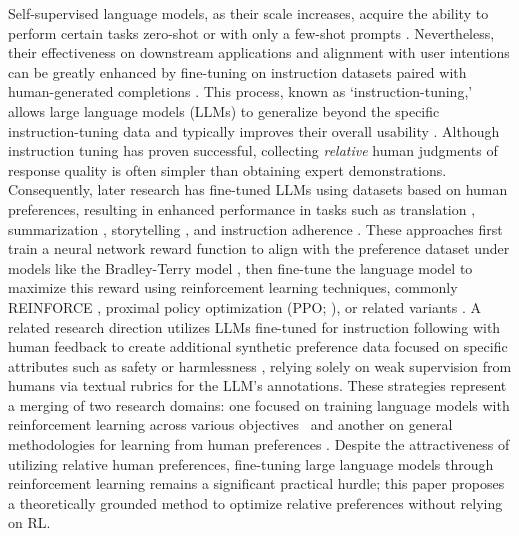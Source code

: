 Self-supervised language models, as their scale increases, acquire the ability to perform certain tasks zero-shot \citep{radford2019language} or with only a few-shot prompts \citep{gpt3,megatron,chowdhery2022palm}. Nevertheless, their effectiveness on downstream applications and alignment with user intentions can be greatly enhanced by fine-tuning on instruction datasets paired with human-generated completions \citep{mishra-etal-2022-cross,sanh2022multitask,chung2022scaling,thoppilan2022lamda}. This process, known as `instruction-tuning,' allows large language models (LLMs) to generalize beyond the specific instruction-tuning data and typically improves their overall usability \citep{chung2022scaling}. Although instruction tuning has proven successful, collecting \textit{relative} human judgments of response quality is often simpler than obtaining expert demonstrations. Consequently, later research has fine-tuned LLMs using datasets based on human preferences, resulting in enhanced performance in tasks such as translation \citep{kreutzer-etal-2018-reliability}, summarization \citep{stiennon2022learning,ziegler2020finetuning}, storytelling \citep{ziegler2020finetuning}, and instruction adherence \citep{ouyang2022training,ramamurthy2023is}. These approaches first train a neural network reward function to align with the preference dataset under models like the Bradley-Terry model \citep{bradley1952rankanalysis}, then fine-tune the language model to maximize this reward using reinforcement learning techniques, commonly REINFORCE \citep{williams1992reinforce}, proximal policy optimization (PPO; \cite{schulman2017proximal}), or related variants \citep{ramamurthy2023is}. A related research direction utilizes LLMs fine-tuned for instruction following with human feedback to create additional synthetic preference data focused on specific attributes such as safety or harmlessness \citep{bai2022constitutional}, relying solely on weak supervision from humans via textual rubrics for the LLM’s annotations. These strategies represent a merging of two research domains: one focused on training language models with reinforcement learning across various objectives~\citep{Ranzato2015SequenceLT,paulus2018a,wu2018learning} and another on general methodologies for learning from human preferences \citep{christiano2017deep,kupcsik2018learning}. Despite the attractiveness of utilizing relative human preferences, fine-tuning large language models through reinforcement learning remains a significant practical hurdle; this paper proposes a theoretically grounded method to optimize relative preferences without relying on RL.

